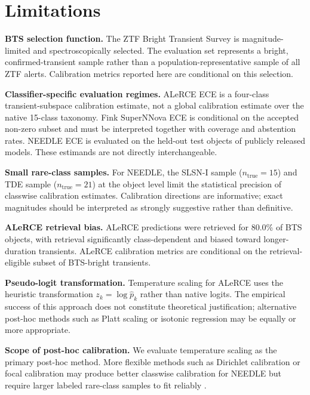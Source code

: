 \documentclass[twocolumn]{aastex631}
\begin{document}
\section{Limitations}\label{sec:limitations}

\textbf{BTS selection function.} The ZTF Bright Transient Survey
is magnitude-limited and spectroscopically selected. The evaluation
set represents a bright, confirmed-transient sample rather than a
population-representative sample of all ZTF alerts. Calibration
metrics reported here are conditional on this selection.

\textbf{Classifier-specific evaluation regimes.} ALeRCE ECE is a
four-class transient-subspace calibration estimate, not a global
calibration estimate over the native 15-class taxonomy. Fink
SuperNNova ECE is conditional on the accepted non-zero subset and
must be interpreted together with coverage and abstention rates.
NEEDLE ECE is evaluated on the held-out test objects of publicly
released models. These estimands are not directly interchangeable.

\textbf{Small rare-class samples.} For NEEDLE, the SLSN-I sample
($n_\mathrm{true} = 15$) and TDE sample ($n_\mathrm{true} = 21$)
at the object level limit the statistical precision of classwise
calibration estimates. Calibration directions are informative;
exact magnitudes should be interpreted as strongly suggestive
rather than definitive.

\textbf{ALeRCE retrieval bias.} ALeRCE predictions were retrieved
for 80.0\% of BTS objects, with retrieval significantly
class-dependent and biased toward longer-duration transients.
ALeRCE calibration metrics are conditional on the
retrieval-eligible subset of BTS-bright transients.

\textbf{Pseudo-logit transformation.} Temperature scaling for
ALeRCE uses the heuristic transformation $z_k = \log \hat{p}_k$
rather than native logits. The empirical success of this approach
does not constitute theoretical justification; alternative
post-hoc methods such as Platt scaling or isotonic regression
may be equally or more appropriate.

\textbf{Scope of post-hoc calibration.} We evaluate temperature
scaling as the primary post-hoc method. More flexible methods
such as Dirichlet calibration \citep{kull2019} or focal
calibration \citep{mukhoti2020} may produce better classwise
calibration for NEEDLE but require larger labeled rare-class
samples to fit reliably \citep{vaicenavicius2019}.
\end{document}
